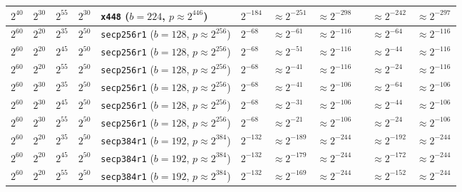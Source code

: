 \begin{table}[p]
\begin{tabular}{@{}lllllllllll@{}}
$2^{40}$	&$2^{30}$	&$2^{55}$	&$2^{30}$	&\texttt{x448} ($b \!=\! 224$,\! $p \!\approx\! 2^{446}$)	&$2^{-184}$	&$\approx 2^{-251}$	& $\approx 2^{-298}$	&& $\approx 2^{-242}$	& $\approx 2^{-297}$	 \\
\midrule
\midrule
$2^{60}$	&$2^{20}$	&$2^{35}$	&$2^{50}$	&\texttt{secp256r1} ($b \!=\! 128$,\! $p \!\approx\! 2^{256}$)	&$2^{-68}$	&\cellcolor{red!25}$\approx 2^{-61}$	&$\approx 2^{-116}$	&& \cellcolor{red!25}$\approx 2^{-64}$	&$\approx 2^{-116}$	 \\
$2^{60}$	&$2^{20}$	&$2^{45}$	&$2^{50}$	&\texttt{secp256r1} ($b \!=\! 128$,\! $p \!\approx\! 2^{256}$)	&$2^{-68}$	&\cellcolor{red!25}$\approx 2^{-51}$	&$\approx 2^{-116}$	&& \cellcolor{red!25}$\approx 2^{-44}$	&$\approx 2^{-116}$	 \\
$2^{60}$	&$2^{20}$	&$2^{55}$	&$2^{50}$	&\texttt{secp256r1} ($b \!=\! 128$,\! $p \!\approx\! 2^{256}$)	&$2^{-68}$	&\cellcolor{red!25}$\approx 2^{-41}$	&$\approx 2^{-116}$	&& \cellcolor{red!25}$\approx 2^{-24}$	&$\approx 2^{-116}$	 \\
$2^{60}$	&$2^{30}$	&$2^{35}$	&$2^{50}$	&\texttt{secp256r1} ($b \!=\! 128$,\! $p \!\approx\! 2^{256}$)	&$2^{-68}$	&\cellcolor{red!25}$\approx 2^{-41}$	&$\approx 2^{-106}$	&& \cellcolor{red!25}$\approx 2^{-64}$	&$\approx 2^{-106}$	 \\
$2^{60}$	&$2^{30}$	&$2^{45}$	&$2^{50}$	&\texttt{secp256r1} ($b \!=\! 128$,\! $p \!\approx\! 2^{256}$)	&$2^{-68}$	&\cellcolor{red!25}$\approx 2^{-31}$	&$\approx 2^{-106}$	&& \cellcolor{red!25}$\approx 2^{-44}$	&$\approx 2^{-106}$	 \\
$2^{60}$	&$2^{30}$	&$2^{55}$	&$2^{50}$	&\texttt{secp256r1} ($b \!=\! 128$,\! $p \!\approx\! 2^{256}$)	&$2^{-68}$	&\cellcolor{red!25}$\approx 2^{-21}$	&$\approx 2^{-106}$	&& \cellcolor{red!25}$\approx 2^{-24}$	&$\approx 2^{-106}$	 \\
\midrule
$2^{60}$	&$2^{20}$	&$2^{35}$	&$2^{50}$	&\texttt{secp384r1} ($b \!=\! 192$,\! $p \!\approx\! 2^{384}$)	&$2^{-132}$	&$\approx 2^{-189}$	& $\approx 2^{-244}$	&& $\approx 2^{-192}$	& $\approx 2^{-244}$	 \\
$2^{60}$	&$2^{20}$	&$2^{45}$	&$2^{50}$	&\texttt{secp384r1} ($b \!=\! 192$,\! $p \!\approx\! 2^{384}$)	&$2^{-132}$	&$\approx 2^{-179}$	& $\approx 2^{-244}$	&& $\approx 2^{-172}$	& $\approx 2^{-244}$	 \\
$2^{60}$	&$2^{20}$	&$2^{55}$	&$2^{50}$	&\texttt{secp384r1} ($b \!=\! 192$,\! $p \!\approx\! 2^{384}$)	&$2^{-132}$	&$\approx 2^{-169}$	& $\approx 2^{-244}$	&& $\approx 2^{-152}$	& $\approx 2^{-244}$	 \\

\end{tabular}
\end{table}
